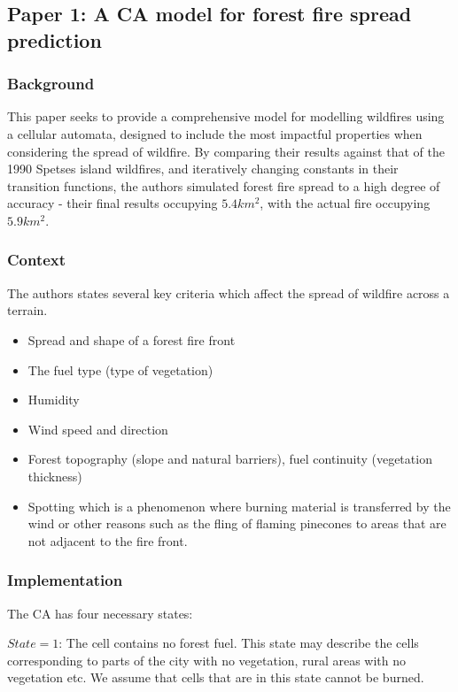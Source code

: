 \documentclass[11pt, a4paper, titlepage]{article}
\begin{document}
  \subsection{Paper 1: A CA model for forest fire spread prediction}
  
    \subsubsection{Background}
 
    This paper seeks to provide a comprehensive model for modelling wildfires using a cellular automata, designed to include the most impactful properties when considering the spread of wildfire. By comparing their results against that of the 1990 Spetses island wildfires, and iteratively changing constants in their transition functions, the authors simulated forest fire spread to a high degree of accuracy - their final results occupying $5.4km^2$, with the actual fire occupying $5.9km^2$.
  
    \subsubsection{Context}  
    The authors states several key criteria which affect the spread of wildfire across a terrain.
    \begin{itemize}

      \item Spread and shape of a forest fire front
      \item The fuel type (type of vegetation)
      \item Humidity
      \item Wind speed and direction
      \item Forest topography (slope and natural barriers), fuel continuity (vegetation thickness)
      \item Spotting which is a phenomenon where burning material is transferred by the wind or other reasons such as the fling of flaming pinecones to areas that are not adjacent to the fire front.
    \end{itemize}
    
  \subsubsection{Implementation}
  
  The CA has four necessary states:
  
  $State = 1$: The cell contains no forest fuel. This state may describe the cells corresponding to parts of the city with no vegetation, rural areas with no vegetation etc. We assume that cells that are in this state cannot be burned.
  
\end{document}
